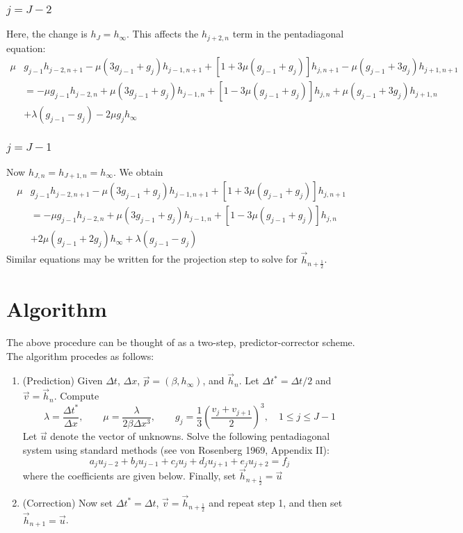 \documentclass[12pt]{article}
\numberwithin{equation}{section}
\begin{document}
\subsubsection{$j=J-2$}

Here, the change is $h_{J} = h_\infty$. This affects the $h_{j+2,n}$ term in the pentadiagonal equation:
\begin{align}
	\mu& g_{j-1} h_{j-2, n+1}
	-  \mu (3g_{j-1} + g_{j}) h_{j-1,n+1}
	+[1 + 3 \mu ( g_{j-1}+ g_j )]h_{j, {n+1}}
	- \mu (g_{j-1} + 3 g_{j}) h_{j+1,n+1} 
	\nonumber \\ 
	&=
	-  \mu  g_{j-1} h_{j-2,n}
	+ \mu (3 g_{j-1}+ g_j ) h_{j-1,n}
	+[1 - 3 \mu (g_{j-1} + g_j)]h_{j,n}
	+ \mu ( g_{j-1}+ 3g_j )h_{j+1,n}
	\nonumber \\ &
	+ \lambda(g_{j-1} - g_{j})
	- 2\mu g_{j} h_\infty
\end{align}


\subsubsection{$j=J-1$}

Now $h_{J,n} = h_{J+1,n} = h_\infty$. We obtain 
\begin{align}
	\mu& g_{j-1} h_{j-2, n+1}
	-  \mu (3g_{j-1} + g_{j}) h_{j-1,n+1}
	+[1 + 3 \mu ( g_{j-1}+ g_j )]h_{j, {n+1}}
	\nonumber \\ 
	&=
	-  \mu  g_{j-1} h_{j-2,n}
	+ \mu (3 g_{j-1}+ g_j ) h_{j-1,n}
	+[1 - 3 \mu (g_{j-1} + g_j)]h_{j,n}
	\nonumber \\ &
	+ 2\mu ( g_{j-1}+ 2g_j ) h_\infty
	+ \lambda(g_{j-1} - g_{j})
\end{align}
%
Similar equations may be written for the projection step to solve for $\vec{h}_{n+\frac{1}{2}}$.




\section{Algorithm}

The above procedure can be thought of as a two-step, predictor-corrector scheme. The algorithm procedes as follows:
\begin{enumerate}
	\item (Prediction) Given $\Delta t$, $\Delta x$, $\vec{p} = (\beta, h_\infty)$, and $\vec{h}_n$. Let $\Delta t^* = \Delta t/2$ and $\vec{v} = \vec{h}_n$. Compute
	\[
		\lambda = \frac{\Delta t^*}{\Delta x}, \qquad
		\mu = \frac{\lambda}{2\beta \Delta x^3}, \qquad
		g_j = 
		\frac{1}{3} \left(\frac{v_{j} +v_{j+1}}{2}\right)^3, 
		\quad 1 \le j \le J-1
	\]
	Let $\vec{u}$ denote the vector of unknowns. Solve the following pentadiagonal system using standard methods (see  von Rosenberg 1969, Appendix II):
	\[
	a_j u_{j-2}
	+
	b_j u_{j-1}
	+
	c_j u_{j}
	+
	d_j u_{j+1}
	+
	e_j u_{j+2}
	=
	f_j
	\] 
	where the coefficients are given below. Finally, set $\vec{h}_{n+\frac{1}{2}} = \vec{u}$
	\item (Correction) Now set $\Delta t^* = \Delta t$, $\vec{v} = \vec{h}_{n+\frac{1}{2}}$ and repeat step 1, and then set $\vec{h}_{n+1} = \vec{u}$.
\end{enumerate}
\end{document}

